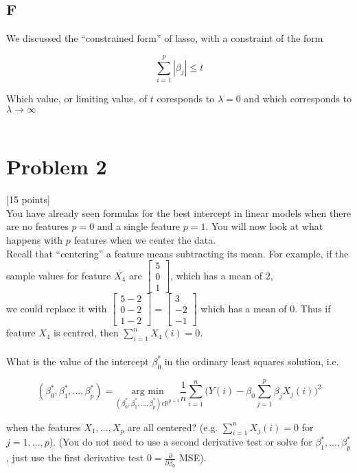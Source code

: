 \documentclass[12pt]{article}
\begin{document}
\subsection{F}
We discussed the “constrained form” of lasso, with a constraint of the form
\begin{center}
    \[\sum_{i=1}^{p}|\beta_j| \leq t\]
\end{center}
Which value, or limiting value, of $t$ coresponds to $\lambda = 0$ and which corresponds to $\lambda \rightarrow \infty$\\\\

\pagebreak
\section{Problem 2}
 [15 points]\\
You have already seen formulas for the best intercept in linear models when there are no
features $p = 0$ and a single feature $p = 1$. You will now look at what happens with $p$ features
when we center the data.\\
Recall that “centering” a feature means subtracting its mean. For example, if the sample values
for feature $X_4$ are $\begin{bmatrix} 5 \\0\\1\end{bmatrix}$, which has a mean of $2$, \\we could replace it with $\begin{bmatrix} 5 - 2\\0 - 2\\1 - 2\end{bmatrix} = \begin{bmatrix} 3\\-2\\-1\end{bmatrix}$ which has a mean of $0$. Thus if feature $X_4$ is centred, then $\sum^n_{i=1}X_4(i) = 0$.\\\\

What is the value of the intercept $\beta^*_0$ in the ordinary least squares solution, i.e.
\begin{center}
    \[
        (\beta^*_0, \beta^*_1, \dots, \beta^*_p) = \underset{(\beta^*_0, \beta^*_1, \dots, \beta^*_p)\epsilon\mathbb{R}^{p+1}}{\text{arg min}}\frac{1}{n}\sum_{i = 1}^{n} \bigg( Y(i) - \beta_0 \sum_{j=1}^p\beta_jX_j(i)\bigg) ^2
    \]
\end{center}
when the features ${X_1, \dots, X_p}$ are all centered? (e.g. $\sum_{i=1}^nX_j(i) = 0$ for $ j = 1, \dots, p$). (You do not need to use a second derivative test or solve for {$\beta_1^*, \dots, \beta_p^*$}, just use the first derivative test $0 = \frac{\partial}{\partial\beta_0}$ MSE).

\end{document}
